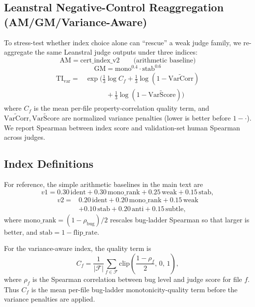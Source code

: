 \documentclass{article}
\begin{document}
\subsection{Leanstral Negative-Control Reaggregation (AM/GM/Variance-Aware)}
To stress-test whether index choice alone can ``rescue'' a weak judge family, we re-aggregate the same Leanstral judge outputs under three indices:
\[
  \mathrm{AM}=\text{cert\_index\_v2}
  \qquad \text{(arithmetic baseline)}
\]
\[
  \mathrm{GM}=\mathrm{mono}^{0.4}\cdot \mathrm{stab}^{0.6}
\]
\[
  \begin{aligned}
    \mathrm{TI}_{\mathrm{var}}
    ={} & \exp\!\Big(
    \tfrac{1}{3}\log C_f
    + \tfrac{1}{3}\log(1-\widetilde{\mathrm{VarCorr}}) \\
        & \qquad\quad
    + \tfrac{1}{3}\log(1-\widetilde{\mathrm{VarScore}})
    \Big)
  \end{aligned}
\]
where \(C_f\) is the mean per-file property-correlation quality term, and \(\widetilde{\mathrm{VarCorr}},\widetilde{\mathrm{VarScore}}\) are normalized variance penalties (lower is better before \(1-\cdot\)).
We report Spearman between index score and validation-set human Spearman across judges.

\subsection{Index Definitions}\label{app:index-definitions}
For reference, the simple arithmetic baselines in the main text are
\[
  v1 = 0.30\,\text{ident} + 0.30\,\text{mono\_rank} + 0.25\,\text{weak} + 0.15\,\text{stab},
\]
\[
  \begin{aligned}
    v2 ={} & 0.20\,\text{ident} + 0.20\,\text{mono\_rank} + 0.15\,\text{weak} \\
           & + 0.10\,\text{stab} + 0.20\,\text{anti} + 0.15\,\text{subtle},
  \end{aligned}
\]
where \(\text{mono\_rank}=(1-\rho_{\text{bug}})/2\) rescales bug-ladder Spearman so that larger is better, and \(\text{stab}=1-\text{flip\_rate}\).

For the variance-aware index, the quality term is
\[
  C_f = \frac{1}{|\mathcal{F}|}\sum_{f \in \mathcal{F}} \mathrm{clip}\!\left(\frac{1-\rho_f}{2},\,0,\,1\right),
\]
where \(\rho_f\) is the Spearman correlation between bug level and judge score for file \(f\). Thus \(C_f\) is the mean per-file bug-ladder monotonicity-quality term before the variance penalties are applied.
\end{document}
